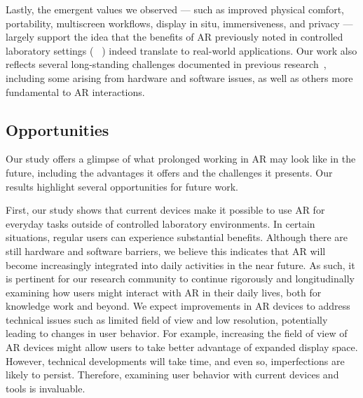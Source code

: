 Lastly, the emergent values we observed --- such as improved physical comfort, portability, multiscreen workflows, display in situ, immersiveness, and privacy --- largely support the idea that the benefits of AR previously noted in controlled laboratory settings (\eg~ \cite{pavanatto2024xrwild,biener2022vrweek,reconviguration2019schneider,ruvimova2020transportaway}) indeed translate to real-world applications.
Our work also reflects several long-standing challenges documented in previous research~\cite{kim2018revisitingtrendsar}, including some arising from hardware and software issues, as well as others more fundamental to AR interactions.

\subsection{Opportunities}
Our study offers a glimpse of what prolonged working in AR may look like in the future, including the advantages it offers and the challenges it presents. 
Our results highlight several opportunities for future work. 

First, our study shows that current devices make it possible to use AR for everyday tasks outside of controlled laboratory environments. In certain situations, regular users can experience substantial benefits. Although there are still hardware and software barriers, we believe this indicates that AR will become increasingly integrated into daily activities in the near future.
As such, it is pertinent for our research community to continue rigorously and longitudinally examining how users might interact with AR in their daily lives, both for knowledge work and beyond.
We expect improvements in AR devices to address technical issues such as limited field of view and low resolution, potentially leading to changes in user behavior.
For example, increasing the field of view of AR devices might allow users to take better advantage of expanded display space.
However, technical developments will take time, and even so, imperfections are likely to persist.
Therefore, examining user behavior with current devices and tools is invaluable.

